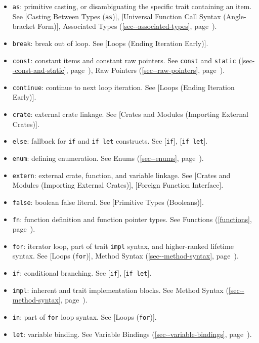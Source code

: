 \documentclass[a4paper,]{book}
\renewcommand*{\hyperlink}[2]{%
 #2 (\autoref{#1}, page~\pageref{#1})}
\providecommand{\tightlist}{%
  \setlength{\itemsep}{0pt}\setlength{\parskip}{0pt}}
\begin{document}
\begin{itemize}
\tightlist
\item
  \texttt{as}: primitive casting, or disambiguating the specific trait
  containing an item. See {[}Casting Between Types (\texttt{as}){]},
  {[}Universal Function Call Syntax (Angle-bracket Form){]},
  \protect\hyperlink{sec--associated-types}{Associated Types}.
\item
  \texttt{break}: break out of loop. See {[}Loops (Ending Iteration
  Early){]}.
\item
  \texttt{const}: constant items and constant raw pointers. See
  \protect\hyperlink{sec--const-and-static}{\texttt{const} and
  \texttt{static}}, \protect\hyperlink{sec--raw-pointers}{Raw Pointers}.
\item
  \texttt{continue}: continue to next loop iteration. See {[}Loops
  (Ending Iteration Early){]}.
\item
  \texttt{crate}: external crate linkage. See {[}Crates and Modules
  (Importing External Crates){]}.
\item
  \texttt{else}: fallback for \texttt{if} and \texttt{if\ let}
  constructs. See {[}\texttt{if}{]}, {[}\texttt{if\ let}{]}.
\item
  \texttt{enum}: defining enumeration. See
  \protect\hyperlink{sec--enums}{Enums}.
\item
  \texttt{extern}: external crate, function, and variable linkage. See
  {[}Crates and Modules (Importing External Crates){]}, {[}Foreign
  Function Interface{]}.
\item
  \texttt{false}: boolean false literal. See {[}Primitive Types
  (Booleans){]}.
\item
  \texttt{fn}: function definition and function pointer types. See
  \protect\hyperlink{functions}{Functions}.
\item
  \texttt{for}: iterator loop, part of trait \texttt{impl} syntax, and
  higher-ranked lifetime syntax. See {[}Loops (\texttt{for}){]},
  \protect\hyperlink{sec--method-syntax}{Method Syntax}.
\item
  \texttt{if}: conditional branching. See {[}\texttt{if}{]},
  {[}\texttt{if\ let}{]}.
\item
  \texttt{impl}: inherent and trait implementation blocks. See
  \protect\hyperlink{sec--method-syntax}{Method Syntax}.
\item
  \texttt{in}: part of \texttt{for} loop syntax. See {[}Loops
  (\texttt{for}){]}.
\item
  \texttt{let}: variable binding. See
  \protect\hyperlink{sec--variable-bindings}{Variable Bindings}.

\end{itemize}
\end{document}
